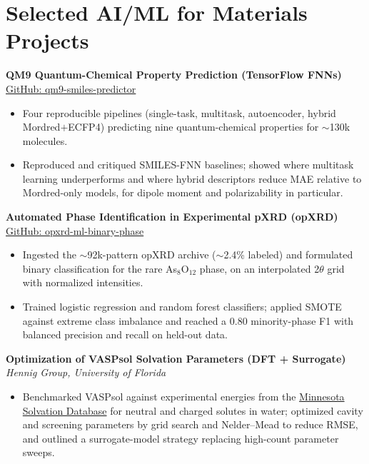 \documentclass[letterpaper,10pt]{article}
\newcommand{\keep}{\needspace{4\baselineskip}}
\newcommand{\keepsection}{\needspace{6\baselineskip}}
\begin{document}
\keepsection\section*{Selected AI/ML for Materials Projects}
\textbf{QM9 Quantum-Chemical Property Prediction (TensorFlow FNNs)} \hfill \href{https://github.com/fl-sean03/qm9-smiles-predictor}{GitHub: qm9-smiles-predictor}
\begin{itemize}
    \item Four reproducible pipelines (single-task, multitask, autoencoder, hybrid Mordred\(+\)ECFP4) predicting nine quantum-chemical properties for \(\sim\)130k molecules.
    \item Reproduced and critiqued SMILES-FNN baselines; showed where multitask learning underperforms and where hybrid descriptors reduce MAE relative to Mordred-only models, for dipole moment and polarizability in particular.
\end{itemize}

\keep\textbf{Automated Phase Identification in Experimental pXRD (opXRD)} \hfill \href{https://github.com/fl-sean03/opxrd-ml-binary-phase}{GitHub: opxrd-ml-binary-phase}
\begin{itemize}
    \item Ingested the \(\sim\)92k-pattern opXRD archive (\(\sim\)2.4\% labeled) and formulated binary classification for the rare As\(_8\)O\(_{12}\) phase, on an interpolated 2\(\theta\) grid with normalized intensities.
    \item Trained logistic regression and random forest classifiers; applied SMOTE against extreme class imbalance and reached a 0.80 minority-phase F1 with balanced precision and recall on held-out data.
\end{itemize}

\keep\textbf{Optimization of VASPsol Solvation Parameters (DFT + Surrogate)} \hfill \textit{Hennig Group, University of Florida}
\begin{itemize}
    \item Benchmarked VASPsol against experimental energies from the \href{https://comp.chem.umn.edu/mnsol}{Minnesota Solvation Database} for neutral and charged solutes in water; optimized cavity and screening parameters by grid search and Nelder--Mead to reduce RMSE, and outlined a surrogate-model strategy replacing high-count parameter sweeps.
\end{itemize}
\end{document}
